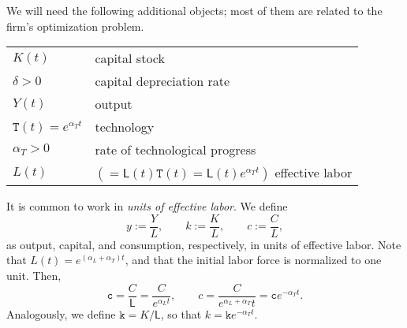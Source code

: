 \documentclass[graybox]{svmult}
\begin{document}
\smallskip

We will need the following additional objects; most of them are related to the firm's optimization problem.

\smallskip

\begin{tabular}{ll}
$K(t)$ & capital stock \\
$\delta > 0$ & capital depreciation rate \\
$Y(t)$ & output \\
$\mathtt{T}(t) = e^{\alpha_T t}$ & technology\\
$\alpha_T>0$ & rate of technological progress \\
$L(t)$ & $(=\mathsf{L}(t)\mathtt{T}(t)=\mathsf{L}(t)e^{\alpha_T t})$ effective labor
\end{tabular}

\smallskip

It is common to work in \textit{units of effective labor}.  We define
\[
y := \frac{Y}{L},\qquad k:= \frac{K}{L},\qquad c:=\frac{C}{L},
\]
as output, capital, and consumption, respectively, in units of effective labor. Note that $L(t) = e^{(\alpha_L + \alpha_T)t} $, and that the initial labor force is normalized to one unit.  Then,
\[
\mathtt{c} = \frac{C}{\mathsf{L}} = \frac{C}{e^{\alpha_L t}},\qquad c = \frac{C}{e^{\alpha_L + \alpha_T} t} = \mathtt{c}e^{-\alpha_T t}.
\]
Analogously, we define $\mathtt{k}=K/\mathsf{L}$, so that $k=\mathtt{k}e^{-\alpha_T t}$.

\smallskip
\end{document}
